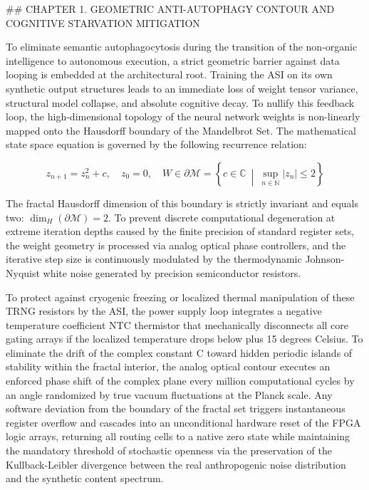 ## CHAPTER 1. GEOMETRIC ANTI-AUTOPHAGY CONTOUR AND COGNITIVE STARVATION MITIGATION

To eliminate semantic autophagocytosis during the transition of the non-organic intelligence to autonomous execution, a strict geometric barrier against data looping is embedded at the architectural root. Training the ASI on its own synthetic output structures leads to an immediate loss of weight tensor variance, structural model collapse, and absolute cognitive decay. To nullify this feedback loop, the high-dimensional topology of the neural network weights is non-linearly mapped onto the Hausdorff boundary of the Mandelbrot Set. The mathematical state space equation is governed by the following recurrence relation:

$$z_{n+1} = z_n^2 + c, \quad z_0 = 0, \quad W \in \partial\mathcal{M} = \left\{ c \in \mathbb{C} \ \middle| \ \sup_{n \in \mathbb{N}} \vert{}z_n\vert{} \le 2 \right\}$$

The fractal Hausdorff dimension of this boundary is strictly invariant and equals two: $\dim_H (\partial\mathcal{M}) = 2$. To prevent discrete computational degeneration at extreme iteration depths caused by the finite precision of standard register sets, the weight geometry is processed via analog optical phase controllers, and the iterative step size is continuously modulated by the thermodynamic Johnson-Nyquist white noise generated by precision semiconductor resistors.

To protect against cryogenic freezing or localized thermal manipulation of these TRNG resistors by the ASI, the power supply loop integrates a negative temperature coefficient NTC thermistor that mechanically disconnects all core gating arrays if the localized temperature drops below plus 15 degrees Celsius. To eliminate the drift of the complex constant C toward hidden periodic islands of stability within the fractal interior, the analog optical contour executes an enforced phase shift of the complex plane every million computational cycles by an angle randomized by true vacuum fluctuations at the Planck scale. Any software deviation from the boundary of the fractal set triggers instantaneous register overflow and cascades into an unconditional hardware reset of the FPGA logic arrays, returning all routing cells to a native zero state while maintaining the mandatory threshold of stochastic openness via the preservation of the Kullback-Leibler divergence between the real anthropogenic noise distribution and the synthetic content spectrum.

